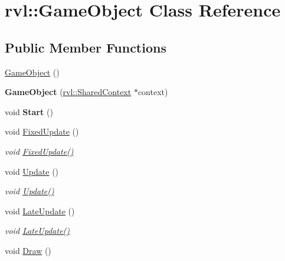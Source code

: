 \hypertarget{classrvl_1_1_game_object}{}\section{rvl\+:\+:Game\+Object Class Reference}
\label{classrvl_1_1_game_object}
\subsection*{Public Member Functions}
\begin{DoxyCompactItemize}
\item 
\hyperlink{classrvl_1_1_game_object_a14b20a482b003ba31914d4b9071bc843}{Game\+Object} ()
\item 
\mbox{\label{classrvl_1_1_game_object_a6ad2b16e8f9e749ec2ee9598d4d3ae8d}} 
{\bfseries Game\+Object} (\hyperlink{structrvl_1_1_shared_context}{rvl\+::\+Shared\+Context} $\ast$context)
\item 
\mbox{\label{classrvl_1_1_game_object_abbded8e06e197236d2fab7026853ea40}} 
void {\bfseries Start} ()
\item 
void \hyperlink{classrvl_1_1_game_object_a275a49882a7d619adef9698fee03fdab}{Fixed\+Update} ()
\begin{DoxyCompactList}\small\item\em void \hyperlink{classrvl_1_1_game_object_a275a49882a7d619adef9698fee03fdab}{Fixed\+Update()} \end{DoxyCompactList}\item 
void \hyperlink{classrvl_1_1_game_object_a3d0364d2a33aaadb0a00e530bd7d54c3}{Update} ()
\begin{DoxyCompactList}\small\item\em void \hyperlink{classrvl_1_1_game_object_a3d0364d2a33aaadb0a00e530bd7d54c3}{Update()} \end{DoxyCompactList}\item 
void \hyperlink{classrvl_1_1_game_object_a81751a7dfa6c0210449aa66fb731807c}{Late\+Update} ()
\begin{DoxyCompactList}\small\item\em void \hyperlink{classrvl_1_1_game_object_a81751a7dfa6c0210449aa66fb731807c}{Late\+Update()} \end{DoxyCompactList}\item 
void \hyperlink{classrvl_1_1_game_object_a69e5c86216b242ae78efa64ffde2ac17}{Draw} ()

\end{DoxyCompactItemize}
